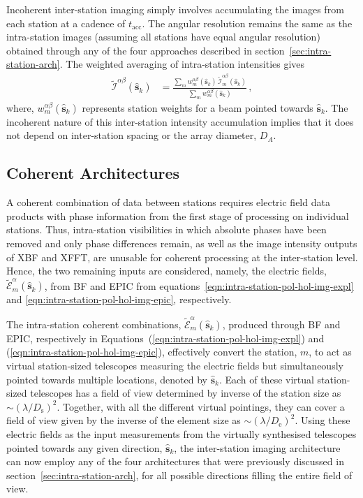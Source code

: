 \documentclass[
  journal=pasa,
  manuscript=article-type,
  year=2020,
  volume=37,
]{cup-journal}
\begin{document}
Incoherent inter-station imaging simply involves accumulating the images from each station at a cadence of $t_\textrm{acc}$. The angular resolution remains the same as the intra-station images (assuming all stations have equal angular resolution) obtained through any of the four approaches described in section~\ref{sec:intra-station-arch}. The weighted averaging of intra-station intensities gives 
\begin{align}
    \widetilde{\mathcal{I}}^{\alpha\beta}(\hat{\boldsymbol{s}}_k) &= \frac{\sum_m w_{m}^{\alpha\beta}(\hat{\boldsymbol{s}}_k) \, \widetilde{\mathcal{I}}_m^{\alpha\beta}(\hat{\boldsymbol{s}}_k)}{\sum_m w_{m}^{\alpha\beta}(\hat{\boldsymbol{s}}_k)} \, , \label{eqn:inter-station-incoherent-pol-images}
\end{align}
where, $w_{m}^{\alpha\beta}(\hat{\boldsymbol{s}}_k)$ represents station weights for a beam pointed towards $\hat{\boldsymbol{s}}_k$. The incoherent nature of this inter-station intensity accumulation implies that it does not depend on inter-station spacing or the array diameter, $D_A$. 

\subsection{Coherent Architectures} \label{sec:coherent}

A coherent combination of data between stations requires electric field data products with phase information from the first stage of processing on individual stations. Thus, intra-station visibilities in which absolute phases have been removed and only phase differences remain, as well as the image intensity outputs of XBF and XFFT, are unusable for coherent processing at the inter-station level. Hence, the two remaining inputs are considered, namely, the electric fields, $\widetilde{\mathcal{E}}_m^\alpha(\hat{\boldsymbol{s}}_k)$, from BF and EPIC from equations~\ref{eqn:intra-station-pol-hol-img-expl} and \ref{eqn:intra-station-pol-hol-img-epic},
respectively. 

The intra-station coherent combinations, $\widetilde{\mathcal{E}}_m^\alpha(\hat{\boldsymbol{s}}_k)$, produced through BF and EPIC, respectively in Equations~(\ref{eqn:intra-station-pol-hol-img-expl}) and (\ref{eqn:intra-station-pol-hol-img-epic}), effectively convert the station, $m$, to act as virtual station-sized telescopes measuring the electric fields but simultaneously pointed towards multiple locations, denoted by $\hat{\boldsymbol{s}}_k$.
Each of these virtual station-sized telescopes has a field of view determined by inverse of the station size as $\sim (\lambda/D_\textrm{s})^2$. Together, with all the different virtual pointings, they can cover a field of view given by the inverse of the element size as $\sim (\lambda/D_\textrm{e})^2$.
Using these electric fields as the input measurements from the virtually synthesised telescopes pointed towards any given direction, $\hat{\boldsymbol{s}}_k$, the inter-station imaging architecture can now employ any of the four architectures that were previously discussed in section~\ref{sec:intra-station-arch}, for all possible directions filling the entire field of view.
\end{document}
